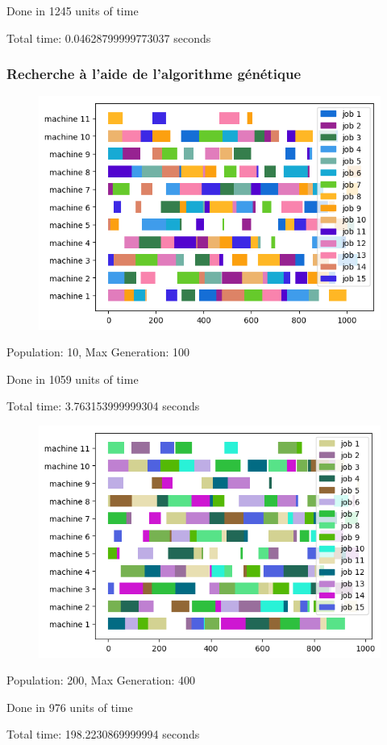 Done in 1245 units of time

Total time: 0.04628799999773037 seconds 
\frameboxend

\newpage

\subsubsection{Recherche à l'aide de l'algorithme génétique}

\begin{figure}[!h]
    \centering
    \includegraphics[]{results/barnes_setb4c9_genetic.png}
\end{figure}

Population: 10, Max Generation: 100

Done in 1059 units of time

Total time: 3.763153999999304 seconds
\frameboxend

\newpage

\begin{figure}[!h]
    \centering
    \includegraphics[]{results/barnes_setb4c9_genetic_2.png}
\end{figure}

Population: 200, Max Generation: 400

Done in 976 units of time

Total time: 198.2230869999994 seconds
\frameboxend